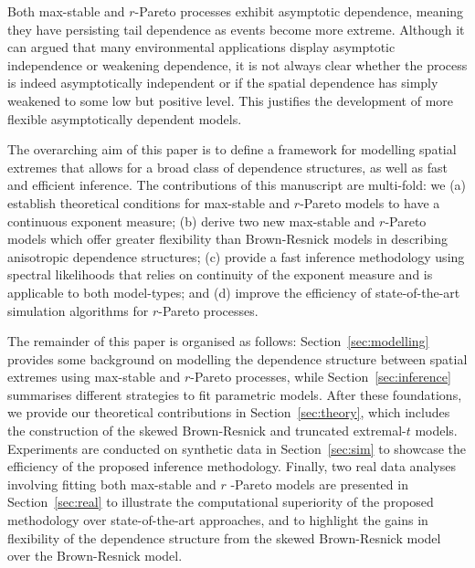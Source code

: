 \documentclass[12pt]{article}
\begin{document}

Both max-stable and $r$-Pareto processes exhibit asymptotic dependence, meaning they have persisting tail dependence 
as events become more extreme. Although it can argued that many environmental applications display asymptotic independence \citep[e.g.,][]{Bopp.etal:2021, Huser.Wadsworth:2019} or weakening dependence, it is not always clear whether the process is indeed asymptotically independent or if the spatial dependence has simply weakened to some low but positive level. This justifies the
development of more flexible asymptotically dependent models.

The overarching aim of this paper is to define a framework for modelling spatial extremes that allows for a broad class of dependence structures, as well as fast and efficient inference. The contributions of this manuscript are multi-fold: we (a) establish theoretical conditions for max-stable and $r$-Pareto models to have a continuous exponent measure; (b) derive two new max-stable and $r$-Pareto models which offer greater flexibility 
than Brown-Resnick models in describing anisotropic dependence structures; %
(c) provide a fast inference methodology using spectral likelihoods that relies on continuity of the exponent measure and is applicable to both model-types; and (d) improve the efficiency of state-of-the-art simulation algorithms for $r$-Pareto processes.    

The remainder of this paper is organised as follows: Section~\ref{sec:modelling} provides some background on 
modelling the dependence structure between spatial extremes using max-stable and $r$-Pareto processes, while Section~\ref{sec:inference} summarises different strategies to fit parametric models. After these foundations,
we provide our theoretical contributions in Section~\ref{sec:theory}, which includes the construction of the skewed Brown-Resnick and truncated extremal-$t$ models. Experiments are conducted on synthetic data in Section~\ref{sec:sim} to showcase the efficiency of the proposed inference methodology. Finally, two real data analyses involving fitting both max-stable and $r$ -Pareto models are presented in Section~\ref{sec:real} to illustrate the computational superiority of the proposed methodology over state-of-the-art approaches, and to highlight the gains in flexibility of the dependence structure from the skewed Brown-Resnick model over the Brown-Resnick model.  
\end{document}
